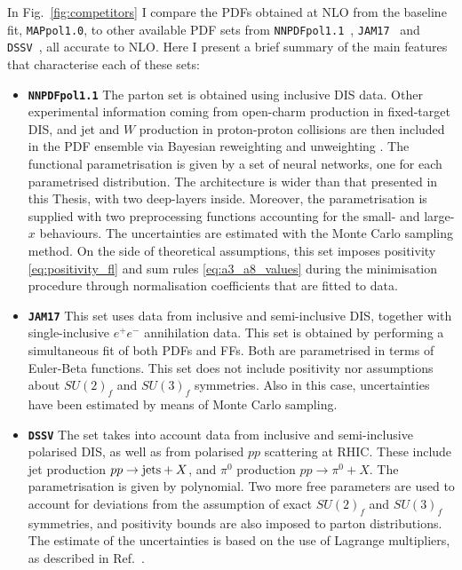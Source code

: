 In Fig.~\ref{fig:competitors} I compare the PDFs obtained at NLO from the baseline fit, \texttt{MAPpol1.0}, to other available PDF sets from \texttt{NNPDFpol1.1}~\cite{Nocera:2014gqa}, \texttt{JAM17}~\cite{Ethier:2017zbq} and \texttt{DSSV}~\cite{deFlorian:2009vb}, all accurate to NLO. Here I present a brief summary of the main features that characterise each of these sets:
\begin{itemize}
  \item[] \texttt{\textbf{NNPDFpol1.1}} The parton set is obtained using inclusive DIS data. Other experimental information coming from open-charm production in fixed-target DIS, and jet and $W$ production in proton-proton collisions are then included in the PDF ensemble via Bayesian reweighting and unweighting \cite{Ball:2011gg, Ball:2010gb}. The functional parametrisation is given by a set of neural networks, one for each parametrised distribution. The architecture is wider than that presented in this Thesis, with two deep-layers inside. Moreover, the parametrisation is supplied with two preprocessing functions accounting for the small- and large-$x$ behaviours. The uncertainties are estimated with the Monte Carlo sampling method. On the side of theoretical assumptions, this set imposes positivity \eqref{eq:positivity_fl} and sum rules \eqref{eq:a3_a8_values} during the minimisation procedure through normalisation coefficients that are fitted to data. 
  \item[] \texttt{\textbf{JAM17}} This set uses data from inclusive and semi-inclusive DIS, together with single-inclusive $e^+ e^-$ annihilation data. This set is obtained by performing a simultaneous fit of both PDFs and FFs. Both are parametrised in terms of Euler-Beta functions. This set does not include positivity nor assumptions about $SU(2)_f$ and $SU(3)_f$ symmetries. Also in this case, uncertainties have been estimated by means of Monte Carlo sampling.
  \item[] \texttt{\textbf{DSSV}} The set takes into account data from inclusive and semi-inclusive polarised DIS, as well as from polarised $pp$ scattering at RHIC. These include jet production $pp \rightarrow \textrm{jets} + X$, and $\pi^0$ production $pp \rightarrow \pi^0 + X$. The parametrisation is given by polynomial. Two more free parameters are used to account for deviations from the assumption of exact $SU(2)_f$ and $SU(3)_f$ symmetries, and positivity bounds are also imposed to parton distributions. The estimate of the uncertainties is based on the use of Lagrange multipliers, as described in Ref.~\cite{Stump:2001gu}.
\end{itemize}

